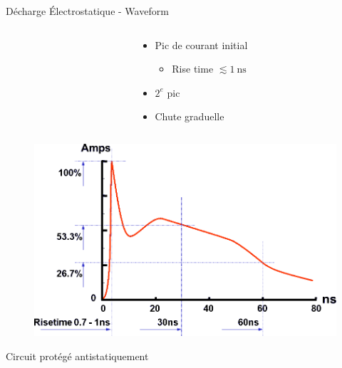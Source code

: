 \begin{frame}{Décharge Électrostatique - Waveform}
    \begin{columns}
        \begin{column}{0.5\textwidth}
        \end{column}
        \begin{column}{0.5\textwidth}
            \begin{itemize}
                \item Pic de courant initial
                \begin{itemize}
                    \item Rise time $\lesssim \SI{1}{\nano\second}$
                \end{itemize}
                \item $2^e$ pic
                \item Chute graduelle
            \end{itemize}
        \end{column}
    \end{columns}

    \vspace{-66pt}

    \begin{figure}
        \centering
        \includegraphics[width=\textwidth]{pictures/ESD-discharge-waveform.png}
    \end{figure}
\end{frame}

\begin{frame}{Circuit protégé antistatiquement}
    \begin{center}
    \end{center}
\end{frame}

